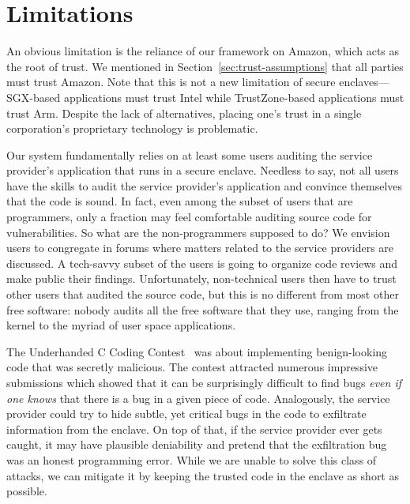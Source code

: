 \section{Limitations}
\label{sec:limitations}

An obvious limitation is the reliance of our framework on Amazon, which acts as the root of trust.  We mentioned in Section~\ref{sec:trust-assumptions} that all parties must trust Amazon.  Note that this is not a new limitation of secure enclaves---SGX-based applications must trust Intel while TrustZone-based applications must trust Arm.  Despite the lack of alternatives, placing one's trust in a single corporation's proprietary technology is problematic.

Our system fundamentally relies on at least some users auditing the service provider's application that runs in a secure enclave.  Needless to say, not all users have the skills to audit the service provider's application and convince themselves that the code is sound.  In fact, even among the subset of users that are programmers, only a fraction may feel comfortable auditing source code for vulnerabilities.  So what are the non-programmers supposed to do?  We envision users to congregate in forums where matters related to the service providers are discussed.  A tech-savvy subset of the users is going to organize code reviews and make public their findings.  Unfortunately, non-technical users then have to trust other users that audited the source code, but this is no different from most other free software: nobody audits all the free software that they use, ranging from the kernel to the myriad of user space applications.

The Underhanded C Coding Contest~\cite{underhanded-c} was about implementing benign-looking code that was secretly malicious.  The contest attracted numerous impressive submissions which showed that it can be surprisingly difficult to find bugs \emph{even if one knows} that there is a bug in a given piece of code.  Analogously, the service provider could try to hide subtle, yet critical bugs in the code to exfiltrate information from the enclave.  On top of that, if the service provider ever gets caught, it may have plausible deniability and pretend that the exfiltration bug was an honest programming error.  While we are unable to solve this class of attacks, we can mitigate it by keeping the trusted code in the enclave as short as possible.
